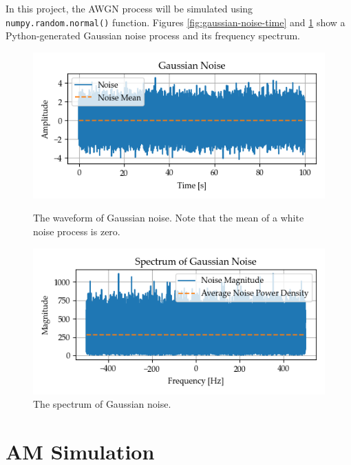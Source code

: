 \documentclass[../ECE459FinalProjectReport.tex]{subfiles}
\begin{document}
In this project, the AWGN process will be simulated using \verb|numpy.random.normal()| function. Figures \ref{fig:gaussian-noise-time} and \ref{fig:gaussian-noise-freq} show a Python-generated Gaussian noise process and its frequency spectrum.
\begin{figure}[tb]
    \begin{minipage}{0.48\textwidth}
        \centering
        \includegraphics[width=\linewidth]{plots/gaussian_noise.png}
        \caption{The waveform of Gaussian noise. Note that the mean of a white noise process is zero.}
        \label{fig:gaussian-noise-time}
    \end{minipage}
    \begin{minipage}{0.48\textwidth}
        \centering
        \includegraphics[width=\linewidth]{plots/gaussian_noise_spectrum.png}
        \caption{The spectrum of Gaussian noise.}
        \label{fig:gaussian-noise-freq}
    \end{minipage}
\end{figure}


\section{AM Simulation}
\end{document}

